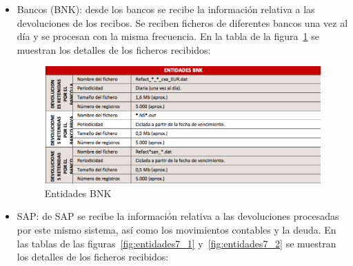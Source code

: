\documentclass[a4paper, 12pt]{book}
\begin{document}
\begin{itemize}
	\item Bancos (BNK): desde los bancos se recibe la información relativa a las devoluciones de los recibos. Se reciben ficheros de diferentes bancos una vez al día y se procesan con la misma frecuencia. En la tabla de la figura~\ref{fig:entidades6} se muestran los detalles de los ficheros recibidos:

	\begin{figure}
	  \centering
	  \includegraphics[width=14cm, keepaspectratio]{img/entidades6}
	  \caption{Entidades BNK}
	  \label{fig:entidades6}
	\end{figure}

	\item SAP: de SAP se recibe la información relativa a las devoluciones procesadas por este mismo sistema, así como los movimientos contables y la deuda. En las tablas de las figuras~\ref{fig:entidades7_1} y~\ref{fig:entidades7_2} se muestran los detalles de los ficheros recibidos:


\end{itemize}
\end{document}
